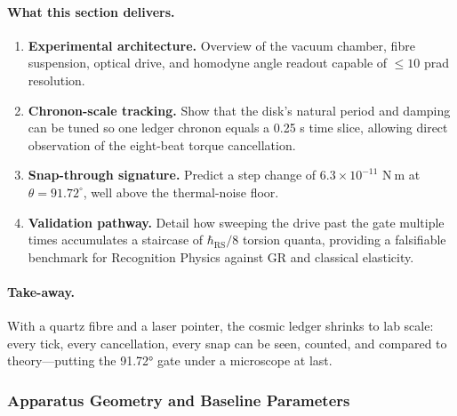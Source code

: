 \documentclass[11pt,oneside]{book}
\begin{document}
\paragraph{What this section delivers.}

\begin{enumerate}[label=\arabic*.,leftmargin=*,itemsep=3pt]
\item \textbf{Experimental architecture.}  
      Overview of the vacuum chamber, fibre suspension, optical
      drive, and homodyne angle readout capable of \(\le\!10\) prad
      resolution.
\item \textbf{Chronon-scale tracking.}  
      Show that the disk’s natural period and damping can be tuned so
      one ledger chronon equals a 0.25 s time slice, allowing direct
      observation of the eight-beat torque cancellation.
\item \textbf{Snap-through signature.}  
      Predict a step change of \(6.3\!\times\!10^{-11}\) N m at
      \(\theta=91.72^\circ\), well above the thermal-noise floor.
\item \textbf{Validation pathway.}  
      Detail how sweeping the drive past the gate multiple times
      accumulates a staircase of \(\hbar_{\mathrm{RS}}/8\) torsion
      quanta, providing a falsifiable benchmark for Recognition
      Physics against GR and classical elasticity.
\end{enumerate}

\paragraph{Take-away.}
With a quartz fibre and a laser pointer, the cosmic ledger shrinks to
lab scale: every tick, every cancellation, every snap can be seen,
counted, and compared to theory—putting the 91.72° gate under a
microscope at last.


\subsubsection{Apparatus Geometry and Baseline Parameters}
\label{ss:torsion-geo}
\end{document}
